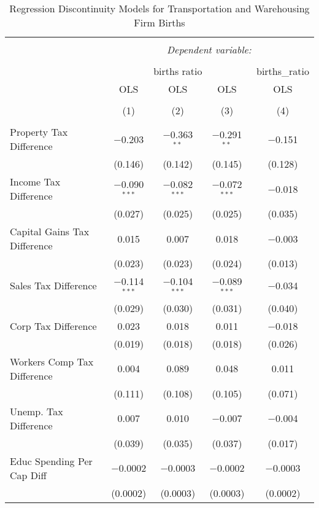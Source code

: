 
\begin{table}[!htbp] \centering 
  \caption{Regression Discontinuity Models for  Transportation and Warehousing Firm Births} 
  \label{48-49rd} 
\begin{tabular}{@{\extracolsep{5pt}}lcccc} 
\\[-1.8ex]\hline 
\hline \\[-1.8ex] 
 & \multicolumn{4}{c}{\textit{Dependent variable:}} \\ 
\cline{2-5} 
\\[-1.8ex] & \multicolumn{3}{c}{births ratio} & births\_ratio \\ 
 & OLS & OLS & OLS & OLS \\ 
\\[-1.8ex] & (1) & (2) & (3) & (4)\\ 
\hline \\[-1.8ex] 
 Property Tax Difference & $-$0.203 & $-$0.363$^{**}$ & $-$0.291$^{**}$ & $-$0.151 \\ 
  & (0.146) & (0.142) & (0.145) & (0.128) \\ 
  Income Tax Difference & $-$0.090$^{***}$ & $-$0.082$^{***}$ & $-$0.072$^{***}$ & $-$0.018 \\ 
  & (0.027) & (0.025) & (0.025) & (0.035) \\ 
  Capital Gains Tax Difference & 0.015 & 0.007 & 0.018 & $-$0.003 \\ 
  & (0.023) & (0.023) & (0.024) & (0.013) \\ 
  Sales Tax Difference & $-$0.114$^{***}$ & $-$0.104$^{***}$ & $-$0.089$^{***}$ & $-$0.034 \\ 
  & (0.029) & (0.030) & (0.031) & (0.040) \\ 
  Corp Tax Difference & 0.023 & 0.018 & 0.011 & $-$0.018 \\ 
  & (0.019) & (0.018) & (0.018) & (0.026) \\ 
  Workers Comp Tax Difference & 0.004 & 0.089 & 0.048 & 0.011 \\ 
  & (0.111) & (0.108) & (0.105) & (0.071) \\ 
  Unemp. Tax Difference & 0.007 & 0.010 & $-$0.007 & $-$0.004 \\ 
  & (0.039) & (0.035) & (0.037) & (0.017) \\ 
  Educ Spending Per Cap Diff & $-$0.0002 & $-$0.0003 & $-$0.0002 & $-$0.0003 \\ 
  & (0.0002) & (0.0003) & (0.0003) & (0.0002) \\ 

\end{tabular}
\end{table}
